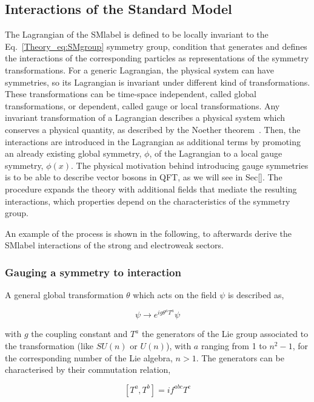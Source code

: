 \subsection{Interactions of the Standard Model}

The Lagrangian of the \acrshort{SMlabel} is defined to be locally invariant to the Eq.~\ref{Theory_eq:SMgroup} symmetry group, condition that generates and defines the interactions of the corresponding particles as representations of the symmetry transformations. For a generic Lagrangian, the physical system can have symmetries, so its Lagrangian is invariant under different kind of transformations. These transformations can be time-space independent, called global transformations, or dependent, called gauge or local transformations. Any invariant transformation of a Lagrangian describes a physical system which conserves a physical quantity, as described by the Noether theorem~\cite{Noether}. Then, the interactions are introduced in the Lagrangian as additional terms by promoting an already existing global symmetry, $\phi$, of the Lagrangian to a local gauge symmetry, $\phi(x)$. The physical motivation behind introducing gauge symmetries is to be able to describe vector bosons in QFT, as we will see in Sec[]. The procedure expands the theory with additional fields that mediate the resulting interactions, which properties depend on the characteristics of the symmetry group.

An example of the process is shown in the following, to afterwards derive the \acrshort{SMlabel} interactions of the strong and electroweak sectors. 

\subsubsection{Gauging a symmetry to interaction}

A general global transformation $\theta$ which acts on the field $\psi$ is described as,

\begin{equation}
    \psi\rightarrow e^{ig\theta^aT^a}\psi
\end{equation}

with $g$ the coupling constant and $T^a$ the generators of the Lie group associated to the transformation (like $SU(n)$ or $U(n)$), with $a$ ranging from 1 to $n^2-1$, for the corresponding number of the Lie algebra, $n>1$. The generators can be characterised by their commutation relation, 

\begin{equation}
\label{Theory_eq:nonabcomutator}
    [T^a,T^b]=if^{abc}T^c
\end{equation}

